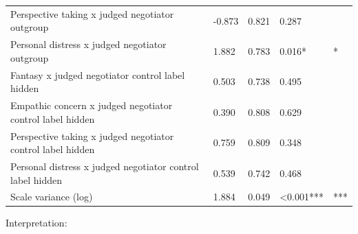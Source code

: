 \documentclass[11pt]{article}
\begin{document}
\begin{table}[H]
{\begin{tabular}{lllll}
Perspective taking x judged negotiator outgroup & -0.873 & 0.821 & 0.287 &  \\
Personal distress x judged negotiator outgroup & 1.882 & 0.783 & 0.016* & * \\
Fantasy x judged negotiator control label hidden & 0.503 & 0.738 & 0.495 &  \\
Empathic concern x judged negotiator control label hidden & 0.390 & 0.808 & 0.629 &  \\
Perspective taking x judged negotiator control label hidden & 0.759 & 0.809 & 0.348 &  \\
Personal distress x judged negotiator control label hidden & 0.539 & 0.742 & 0.468 &  \\
Scale variance (log) & 1.884 & 0.049 & <0.001*** & *** \\
\bottomrule
\end{tabular}
}
\end{table}

Interpretation:
\end{document}
